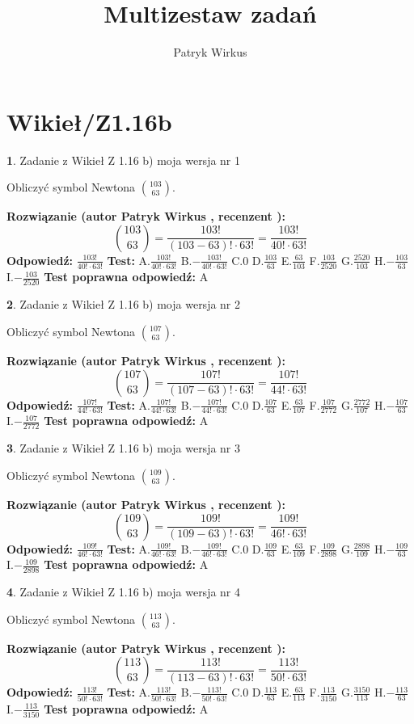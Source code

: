 \documentclass[12pt, a4paper]{article}
\title{Multizestaw zadań}
\author{Patryk Wirkus}
\date{}
\theoremstyle{definition} %
\newtheorem{zad}{}
\newcommand{\kategoria}[1]{\section{#1}}
\newcommand{\zadStart}[1]{\begin{zad}#1\newline}
\newcommand{\zadStop}{\end{zad}}
\newcommand{\rozwStart}[2]{\noindent \textbf{Rozwiązanie (autor #1 , recenzent #2): }\newline}
\newcommand{\rozwStop}{\newline}
\newcommand{\odpStart}{\noindent \textbf{Odpowiedź:}\newline}
\newcommand{\odpStop}{\newline}
\newcommand{\testStart}{\noindent \textbf{Test:}\newline}
\newcommand{\testStop}{\newline}
\newcommand{\kluczStart}{\noindent \textbf{Test poprawna odpowiedź:}\newline}
\newcommand{\kluczStop}{\newline}
\begin{document}
\maketitle

\kategoria{Wikieł/Z1.16b}


\zadStart{Zadanie z Wikieł Z 1.16 b) moja wersja nr 1}

Obliczyć symbol Newtona ${103 \choose 63}$.
\zadStop
\rozwStart{Patryk Wirkus}{}
$${103 \choose 63} = \frac{103!}{(103-63)! \cdot 63!} = \frac{103!}{40! \cdot 63!}$$
\rozwStop
\odpStart
$\frac{103!}{40! \cdot 63!}$
\odpStop
\testStart
A.$\frac{103!}{40! \cdot 63!}$ B.$-\frac{103!}{40! \cdot 63!}$ C.$0$ D.$\frac{103}{63}$ E.$\frac{63}{103}$
F.$\frac{103}{2520}$ G.$\frac{2520}{103}$
H.$-\frac{103}{63}$
I.$-\frac{103}{2520}$
\testStop
\kluczStart
A
\kluczStop



\zadStart{Zadanie z Wikieł Z 1.16 b) moja wersja nr 2}

Obliczyć symbol Newtona ${107 \choose 63}$.
\zadStop
\rozwStart{Patryk Wirkus}{}
$${107 \choose 63} = \frac{107!}{(107-63)! \cdot 63!} = \frac{107!}{44! \cdot 63!}$$
\rozwStop
\odpStart
$\frac{107!}{44! \cdot 63!}$
\odpStop
\testStart
A.$\frac{107!}{44! \cdot 63!}$ B.$-\frac{107!}{44! \cdot 63!}$ C.$0$ D.$\frac{107}{63}$ E.$\frac{63}{107}$
F.$\frac{107}{2772}$ G.$\frac{2772}{107}$
H.$-\frac{107}{63}$
I.$-\frac{107}{2772}$
\testStop
\kluczStart
A
\kluczStop



\zadStart{Zadanie z Wikieł Z 1.16 b) moja wersja nr 3}

Obliczyć symbol Newtona ${109 \choose 63}$.
\zadStop
\rozwStart{Patryk Wirkus}{}
$${109 \choose 63} = \frac{109!}{(109-63)! \cdot 63!} = \frac{109!}{46! \cdot 63!}$$
\rozwStop
\odpStart
$\frac{109!}{46! \cdot 63!}$
\odpStop
\testStart
A.$\frac{109!}{46! \cdot 63!}$ B.$-\frac{109!}{46! \cdot 63!}$ C.$0$ D.$\frac{109}{63}$ E.$\frac{63}{109}$
F.$\frac{109}{2898}$ G.$\frac{2898}{109}$
H.$-\frac{109}{63}$
I.$-\frac{109}{2898}$
\testStop
\kluczStart
A
\kluczStop



\zadStart{Zadanie z Wikieł Z 1.16 b) moja wersja nr 4}

Obliczyć symbol Newtona ${113 \choose 63}$.
\zadStop
\rozwStart{Patryk Wirkus}{}
$${113 \choose 63} = \frac{113!}{(113-63)! \cdot 63!} = \frac{113!}{50! \cdot 63!}$$
\rozwStop
\odpStart
$\frac{113!}{50! \cdot 63!}$
\odpStop
\testStart
A.$\frac{113!}{50! \cdot 63!}$ B.$-\frac{113!}{50! \cdot 63!}$ C.$0$ D.$\frac{113}{63}$ E.$\frac{63}{113}$
F.$\frac{113}{3150}$ G.$\frac{3150}{113}$
H.$-\frac{113}{63}$
I.$-\frac{113}{3150}$
\testStop
\kluczStart
A
\kluczStop
\end{document}
